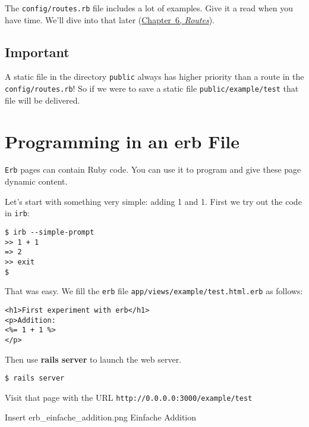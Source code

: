 \documentclass[a4paper]{book}
\begin{document}
The \texttt{config/routes.rb} file includes a lot of examples. Give it a read when you have time. We'll dive into that later (\hyperref[routes]{Chapter~6, \emph{Routes}}).

\subsection{Important}\label{important-4}

A static file in the directory \texttt{public} always has higher priority than a route in the \texttt{config/routes.rb}! So if we were to save a static file \texttt{public/example/test} that file will be delivered.

\section{Programming in an erb File}\label{programming-in-an-erb-file}

\texttt{Erb} pages can contain Ruby code. You can use it to program and give these page dynamic content.

Let's start with something very simple: adding 1 and 1. First we try out the code in \texttt{irb}:

\begin{shaded}\begin{verbatim}
$ irb --simple-prompt
>> 1 + 1
=> 2
>> exit
$
\end{verbatim}\end{shaded}

That was easy. We fill the \texttt{erb} file \texttt{app/views/example/test.html.erb} as follows:

\begin{shaded}\begin{verbatim}
<h1>First experiment with erb</h1>
<p>Addition:
<%= 1 + 1 %>
</p>
\end{verbatim}\end{shaded}

Then use \textbf{rails server} to launch the web server.

\begin{shaded}\begin{verbatim}
$ rails server
\end{verbatim}\end{shaded}

Visit that page with the URL \texttt{http://0.0.0.0:3000/example/test}

Insert erb\_einfache\_addition.png Einfache Addition
\end{document}
